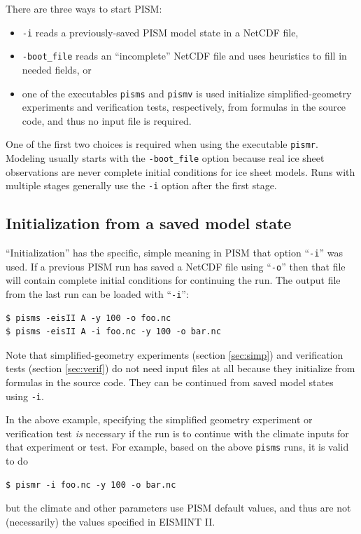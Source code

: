 There are three ways to start PISM:\begin{itemize}
\item \texttt{-i} reads a previously-saved PISM model state in a NetCDF file,
\item \texttt{-boot_file} reads an ``incomplete'' NetCDF file and uses heuristics to fill in needed fields, or
\item one of the executables \texttt{pisms} and \texttt{pismv} is used initialize simplified-geometry experiments and verification tests, respectively, from formulas in the source code, and thus no input file is required.
\end{itemize}
One of the first two choices is required when using the executable \texttt{pismr}.  Modeling usually starts with the \texttt{-boot_file} option because real ice sheet observations are never complete initial conditions for ice sheet models.  Runs with multiple stages generally use the \texttt{-i} option after the first stage.

\subsection{Initialization from a saved model state}  ``Initialization'' has the specific, simple meaning in PISM that option ``\texttt{-i}'' was used.  If a previous PISM run has saved a NetCDF file using ``\texttt{-o}'' then that file will contain complete initial conditions for continuing the run.  The output file from the last run can be loaded with ``\texttt{-i}'': 

\begin{verbatim}
$ pisms -eisII A -y 100 -o foo.nc
$ pisms -eisII A -i foo.nc -y 100 -o bar.nc
\end{verbatim}
\smallskip

Note that simplified-geometry experiments (section \ref{sec:simp}) and verification tests (section \ref{sec:verif}) do not need input files at all because they initialize from formulas in the source code.  They can be continued from saved model states using \texttt{-i}.

In the above example, specifying the simplified geometry experiment or verification test \emph{is} necessary if the run is to continue with the climate inputs for that experiment or test.  For example, based on the above \texttt{pisms} runs, it is valid to do
\begin{verbatim}
$ pismr -i foo.nc -y 100 -o bar.nc
\end{verbatim}
but the climate and other parameters use PISM default values, and thus are not (necessarily) the values specified in EISMINT II.

